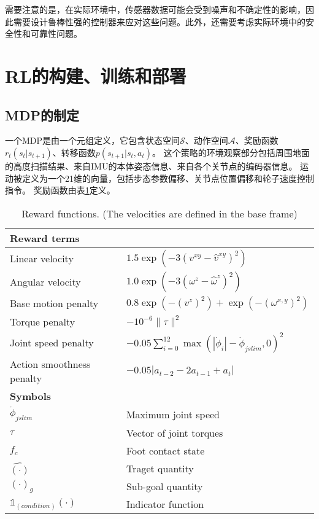 需要注意的是，在实际环境中，传感器数据可能会受到噪声和不确定性的影响，因此需要设计鲁棒性强的控制器来应对这些问题。此外，还需要考虑实际环境中的安全性和可靠性问题。


\section{RL的构建、训练和部署}
\subsection{MDP的制定}

一个MDP是由一个元组定义，它包含状态空间$\mathcal{S}$、动作空间$\mathcal{A}$、奖励函数$r_t(s_t|s_{t+1})$、转移函数$p(s_{t+1}|s_t, a_t)$。
这个策略的环境观察部分包括周围地面的高度扫描结果、来自IMU的本体姿态信息、来自各个关节点的编码器信息。
运动被定义为一个21维的向量，包括步态参数偏移、关节点位置偏移和轮子速度控制指令。
奖励函数由表\ref{table:reward_functions}定义。
\begin{table}[h!]
    \begin{center}
      \caption{Reward functions. (The velocities are defined in the base frame)}
      \label{table:reward_functions}
      \begin{tabular}{l|l} %
        \hline
        \multicolumn{2}{l}{\textbf{Reward terms}}\\
        \hline
        Linear velocity & $1.5 \exp(-3(v^{xy}-\hat v^{xy})^2)$\\
        Angular velocity & $1.0\exp(-3(\omega^z-\hat\omega^z)^2)$\\
        Base motion penalty & $0.8\exp(-(v^z)^2)+\exp(-(\omega^{x,y})^2)$\\
        Torque penalty & $-10^{-6} \|\tau\|^2$\\
        Joint speed penalty & $-0.05\sum_{i=0}^{12}\max(|\dot \phi_i|-\dot\phi_{jslim},0)^2$\\
        Action smoothness penalty & $-0.05|a_{t-2}-2a_{t-1}+a_t|$\\
        \hline
        \multicolumn{2}{l}{\textbf{Symbols}}\\
        \hline
        $\dot \phi_{jslim}$ & Maximum joint speed\\
        $\tau$ & Vector of joint torques\\
        $f_c$ & Foot contact state\\
        $\hat{(\cdot)}$ & Traget quantity\\
        $(\cdot)_g$ & Sub-goal quantity\\
        $\mathbb{1}_{(condition)}(\cdot)$ & Indicator function\\
        \hline
      \end{tabular}
    \end{center}
\end{table}

